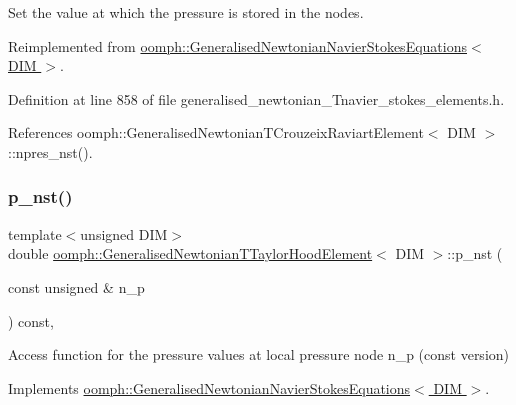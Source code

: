 Set the value at which the pressure is stored in the nodes. 



Reimplemented from \hyperlink{classoomph_1_1GeneralisedNewtonianNavierStokesEquations_aae2c43cb69c84108e838b5aec8bd2a4b}{oomph\+::\+Generalised\+Newtonian\+Navier\+Stokes\+Equations$<$ D\+I\+M $>$}.



Definition at line 858 of file generalised\+\_\+newtonian\+\_\+\+Tnavier\+\_\+stokes\+\_\+elements.\+h.



References oomph\+::\+Generalised\+Newtonian\+T\+Crouzeix\+Raviart\+Element$<$ D\+I\+M $>$\+::npres\+\_\+nst().

\mbox{\label{classoomph_1_1GeneralisedNewtonianTTaylorHoodElement_a014b6af2514d0b354997402d3145dc17}} 
\subsubsection{\texorpdfstring{p\+\_\+nst()}{p\_nst()}\hspace{0.1cm}{\footnotesize\ttfamily [1/2]}}
{\footnotesize\ttfamily template$<$unsigned D\+IM$>$ \\
double \hyperlink{classoomph_1_1GeneralisedNewtonianTTaylorHoodElement}{oomph\+::\+Generalised\+Newtonian\+T\+Taylor\+Hood\+Element}$<$ D\+IM $>$\+::p\+\_\+nst (\begin{DoxyParamCaption}\item[{const unsigned \&}]{n\+\_\+p }\end{DoxyParamCaption}) const\hspace{0.3cm}{\ttfamily [inline]}, {\ttfamily [virtual]}}



Access function for the pressure values at local pressure node n\+\_\+p (const version) 



Implements \hyperlink{classoomph_1_1GeneralisedNewtonianNavierStokesEquations_ae56b835810547b77405585b3a4091eec}{oomph\+::\+Generalised\+Newtonian\+Navier\+Stokes\+Equations$<$ D\+I\+M $>$}.




